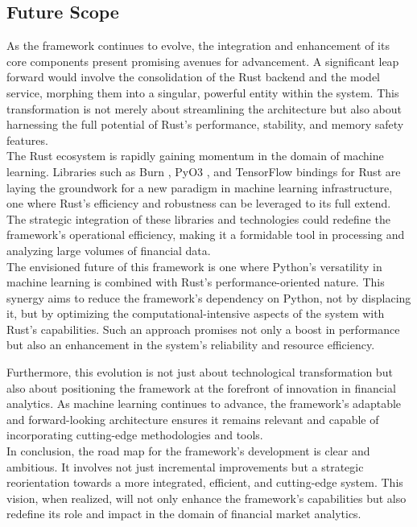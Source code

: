 \subsection{Future Scope}

As the framework continues to evolve, the integration and enhancement of its core components present promising avenues for advancement. A significant leap forward would involve the consolidation of the Rust backend and the model service, morphing them into a singular, powerful entity within the system. This transformation is not merely about streamlining the architecture but also about harnessing the full potential of Rust's performance, stability, and memory safety features. \\

The Rust ecosystem is rapidly gaining momentum in the domain of machine learning. Libraries such as Burn \cite{burnDev}, PyO3 \cite{PyO3PythonFromRust}, and TensorFlow bindings \cite{tensorflowRust} for Rust are laying the groundwork for a new paradigm in machine learning infrastructure, one where Rust's efficiency and robustness can be leveraged to its full extend. The strategic integration of these libraries and technologies could redefine the framework's operational efficiency, making it a formidable tool in processing and analyzing large volumes of financial data. \\

The envisioned future of this framework is one where Python's versatility in machine learning is combined with Rust's performance-oriented nature. This synergy aims to reduce the framework's dependency on Python, not by displacing it, but by optimizing the computational-intensive aspects of the system with Rust's capabilities. Such an approach promises not only a boost in performance but also an enhancement in the system's reliability and resource efficiency.

Furthermore, this evolution is not just about technological transformation but also about positioning the framework at the forefront of innovation in financial analytics. As machine learning continues to advance, the framework's adaptable and forward-looking architecture ensures it remains relevant and capable of incorporating cutting-edge methodologies and tools. 
\\
In conclusion, the road map for the framework's development is clear and ambitious. It involves not just incremental improvements but a strategic reorientation towards a more integrated, efficient, and cutting-edge system. This vision, when realized, will not only enhance the framework's capabilities but also redefine its role and impact in the domain of financial market analytics.
 
